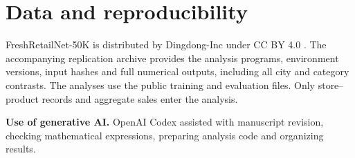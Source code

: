 \documentclass[11pt,a4paper]{article}
\begin{document}
\section*{Data and reproducibility}

FreshRetailNet-50K is distributed by Dingdong-Inc under CC BY 4.0 \cite{ref2,ref7}. The accompanying replication archive provides the analysis programs, environment versions, input hashes and full numerical outputs, including all city and category contrasts. The analyses use the public training and evaluation files. Only store--product records and aggregate sales enter the analysis.

\textbf{Use of generative AI.} OpenAI Codex assisted with manuscript revision, checking mathematical expressions, preparing analysis code and organizing results.
\end{document}
